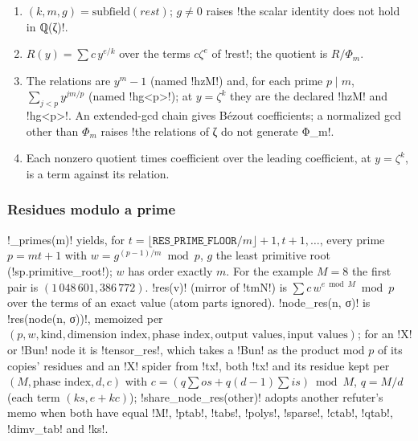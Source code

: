 {{{\begin{algorithm}\label{alg:lean-export-refute-subterms}
\begin{enumerate}
\item $(k, m, g) = \mathrm{subfield}(\mathit{rest})$; $g \ne 0$ raises
\lexcode!the scalar identity does not hold in ℚ(ζ)!.
\item $R(y) = \sum c\,y^{e/k}$ over the terms $c\zeta^e$ of \lexcode!rest!; the quotient is
$R / \Phi_m$.
\item The relations are $y^m - 1$ (named \lexlean!hzM!) and, for each prime $p \mid m$,
$\sum_{j<p} y^{jm/p}$ (named \lexlean!hg<p>!); at $y = \zeta^k$ they are the declared
\lexlean!hzM! and \lexlean!hg<p>!. An extended-gcd chain gives B\'ezout coefficients; a normalized
gcd other than $\Phi_m$ raises \lexcode!the relations of ζ do not generate Φ_m!.
\item Each nonzero quotient times coefficient over the leading coefficient, at $y = \zeta^k$,
is a term against its relation.
\end{enumerate}
\end{algorithm}

\subsubsection{Residues modulo a prime}\label{sec:lean-export-refute-residues}

\lexpy!_primes(m)! yields, for $t = \lfloor \mathtt{RES\_PRIME\_FLOOR}/m\rfloor + 1, t+1, \ldots$,
every prime $p = mt + 1$ with $w = g^{(p-1)/m} \bmod p$, $g$ the least primitive root
(\lexpy!sp.primitive_root!); $w$ has order exactly $m$. For the example $M = 8$ the first pair is
$(1\,048\,601, 386\,772)$. \lexpy!res(v)! (mirror of \lexlean!tmN!) is
$\sum c\,w^{e \bmod M} \bmod p$ over the terms of an exact value (atom parts ignored).
\lexpy!node_res(n, σ)! is \lexpy!res(node(n, σ))!, memoized per
$(p, w, \text{kind}, \text{dimension index}, \text{phase index}, \text{output values},
\text{input values})$; for an \lexcode!X! or \lexcode!Bun! node it is \lexpy!tensor_res!, which
takes a \lexcode!Bun! as the product mod $p$ of its copies' residues and an \lexcode!X! spider
from \lexpy!tx!, both \lexpy!tx! and its residue kept per $(M, \text{phase index}, d, c)$ with
$c = (q\sum os + q(d-1)\sum is) \bmod M$, $q = M/d$ (each term $(ks, e + kc)$);
\lexpy!share_node_res(other)! adopts another refuter's memo when both have
equal \lexpy!M!, \lexpy!ptab!, \lexpy!tabs!, \lexpy!polys!, \lexpy!sparse!, \lexpy!ctab!, \lexpy!qtab!,
\lexpy!dimv_tab! and \lexpy!ks!.

}}}
